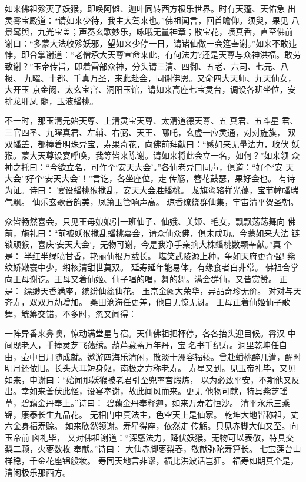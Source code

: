 如来佛祖殄灭了妖猴，即唤阿傩、迦叶同转西方极乐世界。时有天蓬、天佑急
出灵霄宝殿道：“请如来少待，我主大驾来也。”佛祖闻言，回首瞻仰。须臾，果见
八景鸾舆，九光宝盖；声奏玄歌妙乐，咏哦无量神章；散宝花，喷真香，直至佛前
谢曰：“多蒙大法收殄妖邪，望如来少停一日，请诸仙做一会筵奉谢。”如来不敢违
悖，即合掌谢道：“老僧承大天尊宣命来此，有何法力?还是天尊与众神洪福。敢劳
致谢？”玉帝传旨，即着雷部众神，分头请三清、四御、五老、六司、七元、八极、
九曜、十都、千真万圣，来此赴会，同谢佛恩。又命四大天师、九天仙女，大开玉
京金阙、太玄宝宫、洞阳玉馆，请如来高座七宝灵台，调设各班坐位，安排龙肝凤
髓，玉液蟠桃。

不一时，那玉清元始天尊、上清灵宝天尊、太清道德天尊、五真君、五斗星
君、三官四圣、九曜真君、左辅、右弼、天王、哪吒，玄虚一应灵通，对对旌旗，
双双幡盖，都捧着明珠异宝，寿果奇花，向佛前拜献曰：“感如来无量法力，收伏
妖猴。蒙大天尊设宴呼唤，我等皆来陈谢。请如来将此会立一名，如何？”如来领
众神之托曰：“今欲立名，可作个‘安天大会’。”各仙老异口同声，俱道：“好个‘安
天大会’!好个‘安天大会’！”言讫，各坐座位，走传觞，簪花鼓瑟，果好会也。
有诗为证。诗曰：
宴设蟠桃猴搅乱，安天大会胜蟠桃。
龙旗鸾辂祥光蔼，宝节幢幡瑞气飘。
仙乐玄歌音韵美，凤箫玉管响声高。
琼香缭绕群仙集，宇宙清平贺圣朝。

众皆畅然喜会，只见王母娘娘引一班仙子、仙娥、美姬、毛女，飘飘荡荡舞向
佛前，施礼曰：“前被妖猴搅乱蟠桃嘉会，请众仙众佛，俱未成功。今蒙如来大法
链锁顽猴，喜庆‘安天大会’，无物可谢，今是我净手亲摘大株蟠桃数颗奉献。”真
个是：
半红半绿喷甘香，艳丽仙根万载长。
堪笑武陵源上种，争如天府更奇强!
紫纹娇嫩寰中少，缃核清甜世莫双。
延寿延年能易体，有缘食者自非常。
佛祖合掌向王母谢讫。王母又着仙姬、仙子唱的唱，舞的舞。满会群仙，又皆赏赞。
正是：
缥缈天香满座，缤纷仙蕊仙花。
玉京金阙大荣华，异品奇珍无价。
对对与天齐寿，双双万劫增加。
桑田沧海任更差，他自无惊无讶。
王母正着仙姬仙子歌舞，觥筹交错，不多时，忽又闻得：

一阵异香来鼻噢，惊动满堂星与宿。天仙佛祖把杯停，各各抬头迎目候。霄汉
中间现老人，手捧灵芝飞蔼绣。葫芦藏蓄万年丹，宝名书千纪寿。洞里乾坤任自
由，壶中日月随成就。遨游四海乐清闲，散淡十洲容辐辏。曾赴蟠桃醉几遭，醒时
明月还依旧。长头大耳短身躯，南极之方称老寿。
寿星又到。见玉帝礼毕，又见如来，申谢曰：“始闻那妖猴被老君引至兜率宫煅炼，
以为必致平安，不期他又反出。幸如来善伏此怪，设宴奉谢，故此闻风而来。更无
他物可献，特具紫芝瑶草，碧藕金丹奉上。”诗曰：
碧藕金丹奉释迦，如来万寿若恒沙。
清平永乐三乘锦，康泰长生九品花。
无相门中真法主，色空天上是仙家。
乾坤大地皆称祖，丈六金身福寿赊。
如来欣然领谢。寿星得座，依然走传觞。只见赤脚大仙又至。向玉帝前囟礼毕，
又对佛祖谢道：“深感法力，降伏妖猴。无物可以表敬，特具交梨二颗，火枣数枚
奉献。”诗曰：
大仙赤脚枣梨春，敬献弥陀寿算长。
七宝莲台山样稳，千金花座锦般妆。
寿同天地言非谬，福比洪波话岂狂。
福寿如期真个是，清闲极乐那西方。

